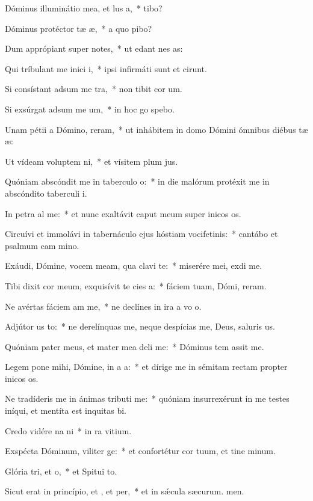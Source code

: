 \item Dóminus illuminátio mea, et lus a,~*  tibo?
\item Dóminus protéctor tæ æ,~* a quo pibo?
\item Dum apprópiant super  notes,~* ut edant nes as:
\item Qui tríbulant me inici i,~* ipsi infirmáti sunt et cirunt.
\item Si consístant adsum me tra,~* non tibit cor um.
\item Si exsúrgat adsum me um,~* in hoc go spebo.
\item Unam pétii a Dómino,  reram,~* ut inhábitem in domo Dómini ómnibus diébus tæ æ:
\item Ut vídeam voluptem ni,~* et vísitem plum jus.
\item Quóniam abscóndit me in taberculo o:~* in die malórum protéxit me in abscóndito taberculi i.
\item In petra al me:~* et nunc exaltávit caput meum super inicos os.
\item Circuívi et immolávi in tabernáculo ejus hóstiam vocifetinis:~* cantábo et psalmum cam mino.
\item Exáudi, Dómine, vocem meam, qua clavi  te:~* miserére mei,  exdi me.
\item Tibi dixit cor meum, exquisívit te cies a:~* fáciem tuam, Dómi, reram.
\item Ne avértas fáciem am  me,~* ne declínes in ira a vo o.
\item Adjútor us to:~* ne derelínquas me, neque despícias me, Deus, saluris us.
\item Quóniam pater meus, et mater mea deli me:~* Dóminus tem assit me.
\item Legem pone mihi, Dómine, in a a:~* et dírige me in sémitam rectam propter inicos os.
\item Ne tradíderis me in ánimas tributi me:~* quóniam insurrexérunt in me testes iníqui, et mentíta est inquitas bi.
\item Credo vidére na ni~* in ra vitium.
\item Exspécta Dóminum, viliter ge:~* et confortétur cor tuum, et tine minum.
\item Glória tri, et o,~* et Spitui to.
\item Sicut erat in princípio, et , et per,~* et in sǽcula sæcurum. men.

